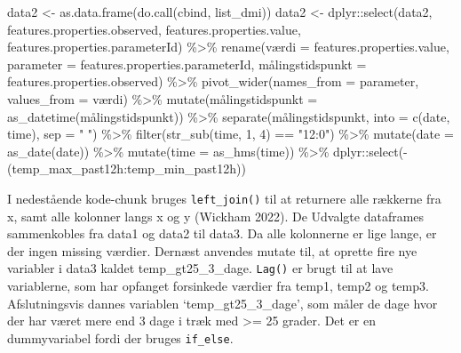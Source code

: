 \documentclass[
  12pt,
  a4paper,
  DIV=11,
  numbers=noendperiod]{scrartcl}
\newenvironment{Shaded}{\begin{snugshade}}{\end{snugshade}}
\newcommand{\AttributeTok}[1]{\textcolor[rgb]{0.40,0.45,0.13}{#1}}
\newcommand{\DecValTok}[1]{\textcolor[rgb]{0.68,0.00,0.00}{#1}}
\newcommand{\FunctionTok}[1]{\textcolor[rgb]{0.28,0.35,0.67}{#1}}
\newcommand{\NormalTok}[1]{\textcolor[rgb]{0.00,0.23,0.31}{#1}}
\newcommand{\OtherTok}[1]{\textcolor[rgb]{0.00,0.23,0.31}{#1}}
\newcommand{\SpecialCharTok}[1]{\textcolor[rgb]{0.37,0.37,0.37}{#1}}
\newcommand{\StringTok}[1]{\textcolor[rgb]{0.13,0.47,0.30}{#1}}
\begin{document}
\begin{Shaded}
\begin{Highlighting}[numbers=left,,]
\NormalTok{data2 }\OtherTok{\textless{}{-}} \FunctionTok{as.data.frame}\NormalTok{(}\FunctionTok{do.call}\NormalTok{(cbind, list\_dmi))}
\NormalTok{data2 }\OtherTok{\textless{}{-}}\NormalTok{ dplyr}\SpecialCharTok{::}\FunctionTok{select}\NormalTok{(data2, features.properties.observed,}
\NormalTok{                       features.properties.value,}
\NormalTok{                       features.properties.parameterId) }\SpecialCharTok{\%\textgreater{}\%} 
  \FunctionTok{rename}\NormalTok{(værdi }\OtherTok{=}\NormalTok{ features.properties.value, }\AttributeTok{parameter =}
\NormalTok{                 features.properties.parameterId,}
\NormalTok{  målingstidspunkt }\OtherTok{=}\NormalTok{ features.properties.observed) }\SpecialCharTok{\%\textgreater{}\%}
  \FunctionTok{pivot\_wider}\NormalTok{(}\AttributeTok{names\_from =}\NormalTok{ parameter, }\AttributeTok{values\_from =}\NormalTok{ værdi) }\SpecialCharTok{\%\textgreater{}\%} 
  \FunctionTok{mutate}\NormalTok{(målingstidspunkt }\OtherTok{=} \FunctionTok{as\_datetime}\NormalTok{(målingstidspunkt)) }\SpecialCharTok{\%\textgreater{}\%}
  \FunctionTok{separate}\NormalTok{(målingstidspunkt, }\AttributeTok{into =} \FunctionTok{c}\NormalTok{(}\StringTok{\textquotesingle{}date\textquotesingle{}}\NormalTok{, }\StringTok{\textquotesingle{}time\textquotesingle{}}\NormalTok{), }\AttributeTok{sep =} \StringTok{" "}\NormalTok{) }\SpecialCharTok{\%\textgreater{}\%} 
  \FunctionTok{filter}\NormalTok{(}\FunctionTok{str\_sub}\NormalTok{(time, }\DecValTok{1}\NormalTok{, }\DecValTok{4}\NormalTok{) }\SpecialCharTok{==} \StringTok{"12:0"}\NormalTok{) }\SpecialCharTok{\%\textgreater{}\%} 
  \FunctionTok{mutate}\NormalTok{(}\AttributeTok{date =} \FunctionTok{as\_date}\NormalTok{(date)) }\SpecialCharTok{\%\textgreater{}\%}
  \FunctionTok{mutate}\NormalTok{(}\AttributeTok{time =} \FunctionTok{as\_hms}\NormalTok{(time)) }\SpecialCharTok{\%\textgreater{}\%} 
\NormalTok{  dplyr}\SpecialCharTok{::}\FunctionTok{select}\NormalTok{(}\SpecialCharTok{{-}}\NormalTok{(temp\_max\_past12h}\SpecialCharTok{:}\NormalTok{temp\_min\_past12h))}
\end{Highlighting}
\end{Shaded}

I nedestående kode-chunk bruges \texttt{left\_join()} til at returnere
alle rækkerne fra x, samt alle kolonner langs x og y (Wickham 2022). De
Udvalgte dataframes sammenkobles fra data1 og data2 til data3. Da alle
kolonnerne er lige lange, er der ingen missing værdier. Dernæst anvendes
mutate til, at oprette fire nye variabler i data3 kaldet
temp\_gt25\_3\_dage. \texttt{Lag()} er brugt til at lave variablerne,
som har opfanget forsinkede værdier fra temp1, temp2 og temp3.
Afslutningsvis dannes variablen `temp\_gt25\_3\_dage', som måler de dage
hvor der har været mere end 3 dage i træk med \textgreater= 25 grader.
Det er en dummyvariabel fordi der bruges \texttt{if\_else}.
\end{document}
